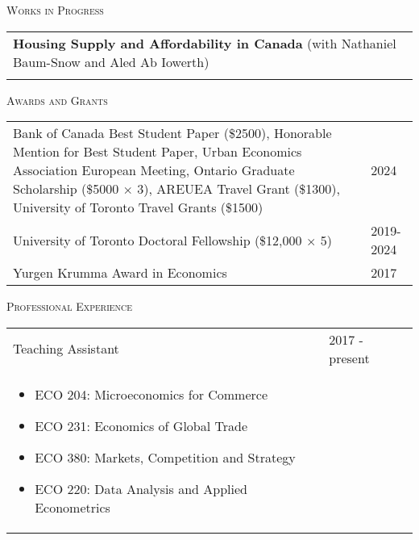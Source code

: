 \documentclass[11pt]{amsart}
\begin{document}
\vspace{0.4cm}


\LARGE
\textsc{Works in Progress}
\vspace{0.2cm}
\normalsize

\begin{tabular}{ p{15.5cm}}
	\textbf{Housing Supply and Affordability in Canada} (with Nathaniel Baum-Snow and Aled Ab Iowerth)                         \\
	\normalsize
\end{tabular}

\vspace{0.4cm}

\LARGE
\textsc{Awards and Grants}
\vspace{0.2cm}

\normalsize 
\begin{tabular}{ p{12.5cm}  p{5cm}}
	
  Bank of Canada Best Student Paper (\$2500), Honorable Mention for Best Student Paper, Urban Economics Association European Meeting,   Ontario Graduate Scholarship (\$5000 $\times$ 3),  AREUEA Travel Grant (\$1300), University of Toronto Travel Grants (\$1500) & 2024 \\
  \vspace{1mm}
  University of Toronto Doctoral Fellowship  (\$12,000 $ \times$ 5) &   \vspace{1mm} 2019-2024 \\
  \vspace{1mm}
  Yurgen Krumma Award in Economics &   \vspace{1mm} 2017
\end{tabular}

\vspace{0.4cm}

\LARGE
\textsc{Professional Experience}
\vspace{0.2cm}
\normalsize

\begin{tabular}{ p{12.5cm} p{5cm}}
Teaching Assistant & 2017 - present \\
\begin{itemize}
  \item ECO 204: Microeconomics for Commerce
  \item ECO 231: Economics of Global Trade
  \item ECO 380: Markets, Competition and Strategy
  \item ECO 220: Data Analysis and Applied Econometrics
\end{itemize} 
                   &                
\end{tabular}
\end{document}
